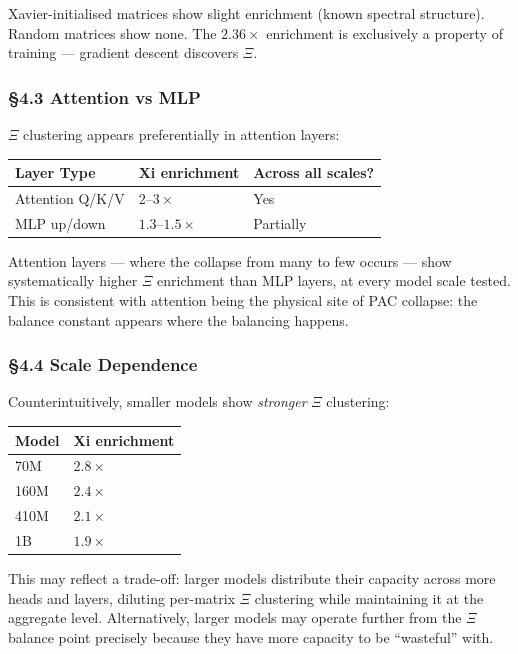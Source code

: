 \documentclass[
  11pt,
  a4paper]{article}
\begin{document}
Xavier-initialised matrices show slight enrichment (known spectral
structure). Random matrices show none. The \(2.36\times\) enrichment is
exclusively a property of training --- gradient descent discovers
\(\Xi\).

\subsubsection{§4.3 Attention vs MLP}\label{attention-vs-mlp}

\(\Xi\) clustering appears preferentially in attention layers:

\begin{longtable}[]{@{}lll@{}}
\toprule\noalign{}
Layer Type & Xi enrichment & Across all scales? \\
\midrule\noalign{}
\endhead
\bottomrule\noalign{}
\endlastfoot
Attention Q/K/V & \(2\)--\(3\times\) & Yes \\
MLP up/down & \(1.3\)--\(1.5\times\) & Partially \\
\end{longtable}

Attention layers --- where the collapse from many to few occurs --- show
systematically higher \(\Xi\) enrichment than MLP layers, at every model
scale tested. This is consistent with attention being the physical site
of PAC collapse: the balance constant appears where the balancing
happens.

\subsubsection{§4.4 Scale Dependence}\label{scale-dependence-1}

Counterintuitively, smaller models show \emph{stronger} \(\Xi\)
clustering:

\begin{longtable}[]{@{}ll@{}}
\toprule\noalign{}
Model & Xi enrichment \\
\midrule\noalign{}
\endhead
\bottomrule\noalign{}
\endlastfoot
70M & \(2.8\times\) \\
160M & \(2.4\times\) \\
410M & \(2.1\times\) \\
1B & \(1.9\times\) \\
\end{longtable}

This may reflect a trade-off: larger models distribute their capacity
across more heads and layers, diluting per-matrix \(\Xi\) clustering
while maintaining it at the aggregate level. Alternatively, larger
models may operate further from the \(\Xi\) balance point precisely
because they have more capacity to be ``wasteful'' with.
\end{document}
